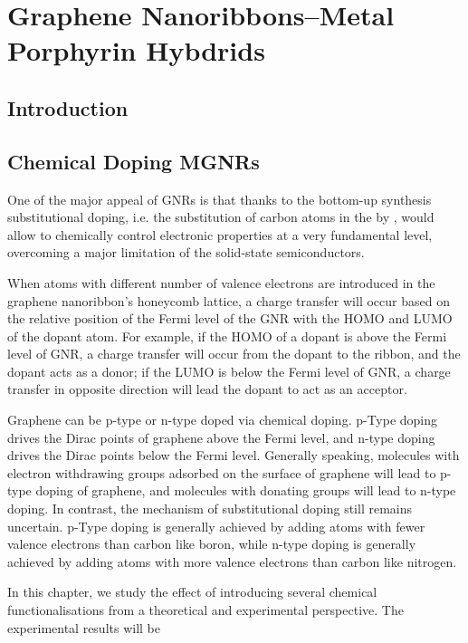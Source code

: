 \chapter{\label{ch:gnr-hybrid}Graphene Nanoribbons--Metal Porphyrin Hybdrids}

\minitoc

\section{Introduction}\label{gnr-hybrid:sec:intro}



\section{Chemical Doping MGNRs}
One of the major appeal of \glspl{GNR} is that thanks to the bottom-up synthesis substitutional doping, i.e. the substitution of carbon atoms in the  by , would allow to chemically control electronic properties at a very fundamental level, overcoming a major limitation of the solid-state semiconductors.

When atoms with different number of valence electrons are introduced in the graphene nanoribbon's honeycomb lattice, a charge transfer will occur based on the relative position of the Fermi level of the GNR with the HOMO and LUMO of the dopant atom. For example, if the HOMO of a dopant is above the Fermi level of GNR, a charge transfer will occur from the dopant to the ribbon, and the dopant acts as a donor; if the LUMO is below the Fermi level of GNR, a charge transfer in opposite direction will lead the dopant  to act as an acceptor.

Graphene can be p-type or n-type doped via chemical doping. p-Type doping drives the Dirac points of graphene above the Fermi level, and n-type doping drives the Dirac points below the Fermi level. Generally speaking, molecules with electron withdrawing groups adsorbed on the surface of graphene will lead to p-type doping of graphene, and molecules with donating groups will lead to n-type doping. In contrast, the mechanism of substitutional doping still remains uncertain. p-Type doping is generally achieved by adding atoms with fewer valence electrons than carbon like boron, while n-type doping is generally achieved by adding atoms with more valence electrons than carbon like nitrogen.

In this chapter, we study the effect of introducing several chemical functionalisations from a theoretical and experimental perspective. The experimental results will be

